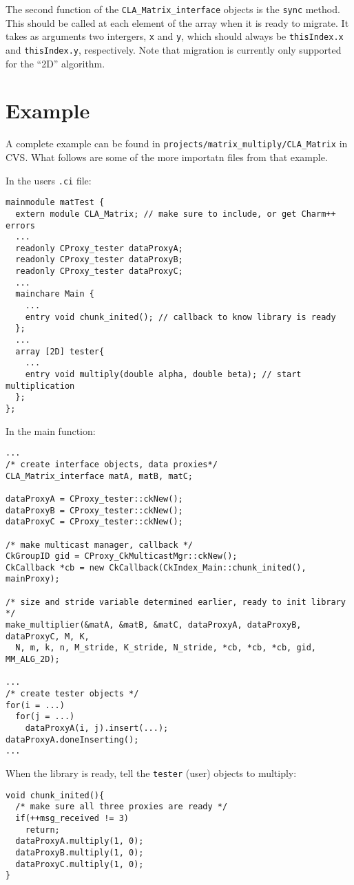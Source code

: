 The second function of the {\tt CLA\_Matrix\_interface} objects is the
{\tt sync} method. This should be called at each element of the array when it
is ready to migrate. It takes as arguments two intergers, {\tt x} and {\tt y},
which should always be {\tt thisIndex.x} and {\tt thisIndex.y}, respectively.
Note that migration is currently only supported for the ``2D'' algorithm.

\section{Example}
A complete example can be found in {\tt projects/matrix\_multiply/CLA\_Matrix}
in CVS. What follows are some of the more importatn files from that example.

In the users {\tt .ci} file:
\begin{verbatim}
mainmodule matTest {
  extern module CLA_Matrix; // make sure to include, or get Charm++ errors
  ...
  readonly CProxy_tester dataProxyA;
  readonly CProxy_tester dataProxyB;
  readonly CProxy_tester dataProxyC;
  ...
  mainchare Main {
    ...
    entry void chunk_inited(); // callback to know library is ready
  };
  ...
  array [2D] tester{
    ...
    entry void multiply(double alpha, double beta); // start multiplication
  };
};
\end{verbatim}

In the main function:
\begin{verbatim}
...
/* create interface objects, data proxies*/
CLA_Matrix_interface matA, matB, matC;

dataProxyA = CProxy_tester::ckNew();
dataProxyB = CProxy_tester::ckNew();
dataProxyC = CProxy_tester::ckNew();

/* make multicast manager, callback */
CkGroupID gid = CProxy_CkMulticastMgr::ckNew();
CkCallback *cb = new CkCallback(CkIndex_Main::chunk_inited(), mainProxy);

/* size and stride variable determined earlier, ready to init library */
make_multiplier(&matA, &matB, &matC, dataProxyA, dataProxyB, dataProxyC, M, K,
  N, m, k, n, M_stride, K_stride, N_stride, *cb, *cb, *cb, gid, MM_ALG_2D);

...
/* create tester objects */
for(i = ...)
  for(j = ...)
    dataProxyA(i, j).insert(...);
dataProxyA.doneInserting();
...
\end{verbatim}

When the library is ready, tell the {\tt tester} (user) objects to multiply:
\begin{verbatim}
void chunk_inited(){
  /* make sure all three proxies are ready */
  if(++msg_received != 3)
    return;
  dataProxyA.multiply(1, 0);
  dataProxyB.multiply(1, 0);
  dataProxyC.multiply(1, 0);
}
\end{verbatim}

